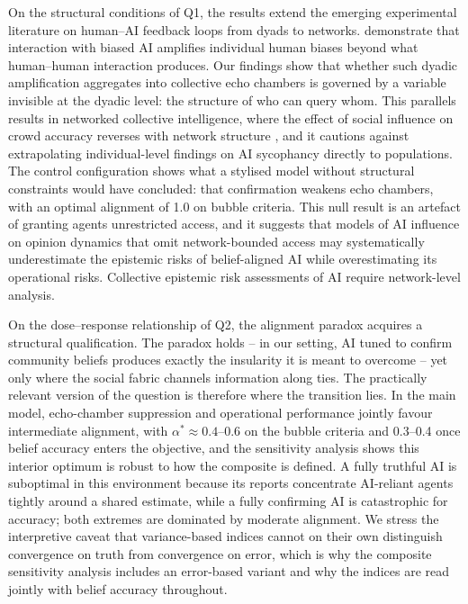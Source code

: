 \documentclass[pdflatex,sn-basic]{sn-jnl}
\begin{document}
On the structural conditions of Q1, the results extend the emerging experimental literature on human--AI feedback loops from dyads to networks. \citet{glickman2024human} demonstrate that interaction with biased AI amplifies individual human biases beyond what human--human interaction produces. Our findings show that whether such dyadic amplification aggregates into collective echo chambers is governed by a variable invisible at the dyadic level: the structure of who can query whom. This parallels results in networked collective intelligence, where the effect of social influence on crowd accuracy reverses with network structure \citep{lorenz2011social,becker2017network}, and it cautions against extrapolating individual-level findings on AI sycophancy \citep{sharma2024sycophancy,sharma2024generative} directly to populations. The control configuration shows what a stylised model without structural constraints would have concluded: that confirmation weakens echo chambers, with an optimal alignment of 1.0 on bubble criteria. This null result is an artefact of granting agents unrestricted access, and it suggests that models of AI influence on opinion dynamics that omit network-bounded access may systematically underestimate the epistemic risks of belief-aligned AI while overestimating its operational risks. Collective epistemic risk assessments of AI require network-level analysis.

On the dose--response relationship of Q2, the alignment paradox \citep{west2025alignment} acquires a structural qualification. The paradox holds -- in our setting, AI tuned to confirm community beliefs produces exactly the insularity it is meant to overcome -- yet only where the social fabric channels information along ties. The practically relevant version of the question is therefore where the transition lies. In the main model, echo-chamber suppression and operational performance jointly favour intermediate alignment, with $\alpha^{*} \approx 0.4$--$0.6$ on the bubble criteria and 0.3--0.4 once belief accuracy enters the objective, and the sensitivity analysis shows this interior optimum is robust to how the composite is defined. A fully truthful AI is suboptimal in this environment because its reports concentrate AI-reliant agents tightly around a shared estimate, while a fully confirming AI is catastrophic for accuracy; both extremes are dominated by moderate alignment. We stress the interpretive caveat that variance-based indices cannot on their own distinguish convergence on truth from convergence on error, which is why the composite sensitivity analysis includes an error-based variant and why the indices are read jointly with belief accuracy throughout.
\end{document}
